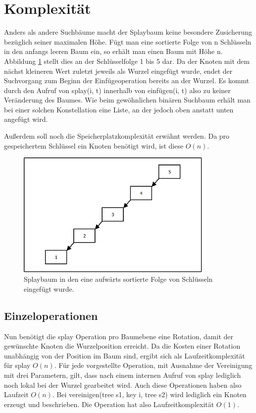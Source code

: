 \documentclass[11pt, a4paper]{article}
\begin{document}
 \section{Komplexität}
 Anders als andere Suchbäume macht der Splaybaum keine besondere Zusicherung bezüglich seiner maximalen Höhe. Fügt man eine sortierte Folge von n Schlüsseln in den anfangs leeren Baum ein, so erhält man einen Baum mit Höhe n. Abbildung \ref{fig:suchbaumhoeen} stellt dies an der Schlüsselfolge 1 bis 5 dar. Da der Knoten mit dem nächst kleineren Wert zuletzt jeweils als Wurzel eingefügt wurde, endet der Suchvorgang zum Beginn der Einfügeoperation bereits an der Wurzel. Es kommt durch den Aufruf von splay(i, t) innerhalb von einfügen(i, t) also zu keiner Veränderung des Baumes. Wie beim gewöhnlichen binären Suchbaum erhält man bei einer solchen Konstellation eine Liste, an der jedoch oben anstatt unten angefügt wird. 

\noindent Außerdem soll noch die Speicherplatzkomplexität erwähnt werden. Da pro gespeichertem Schlüssel ein Knoten benötigt wird, ist diese  $O(n)$.


 
 
 \begin{figure}[h]
 	\centering
 	\includegraphics[width=0.85\textwidth]{"bilder/suchbaumhoeen"}
 	\caption{Splaybaum in den eine aufwärts sortierte Folge von Schlüsseln eingefügt wurde. }
 	\label{fig:suchbaumhoeen}
 \end{figure}  
 
  
 \subsection {Einzeloperationen}
 Nun benötigt die splay Operation pro Baumebene eine Rotation, damit der gewünschte Knoten die Wurzelposition erreicht. Da die Kosten einer Rotation unabhängig von der Position im Baum sind, ergibt sich als Laufzeitkomplexität für splay $O(n)$. Für jede vorgestellte Operation, mit Ausnahme der Vereinigung mit drei Parametern, gilt, dass nach einem internen Aufruf von splay lediglich noch lokal bei der Wurzel gearbeitet wird. Auch diese Operationen haben also Laufzeit $O(n)$. Bei  vereinigen(tree s1, key i, tree s2) wird lediglich ein Knoten erzeugt und beschrieben. Die Operation hat also Laufzeitkomplexität  $O(1)$.
 
\end{document}
